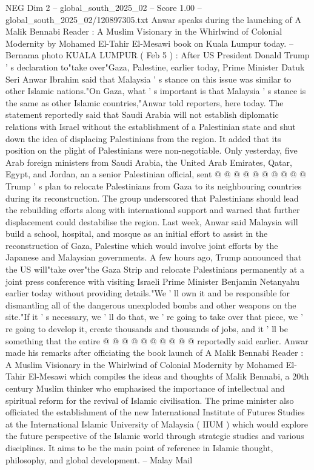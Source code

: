 \begin{textsample}{NEG Dim 2 – global\_south\_2025\_02 – Score 1.00 – global\_south\_2025\_02/120897305.txt}  \label{ex:f2_neg_025}
Anwar speaks during the launching of A Malik Bennabi Reader : A Muslim Visionary in the Whirlwind of Colonial Modernity by Mohamed El-Tahir El-Mesawi book on Kuala Lumpur today. -- Bernama photo KUALA LUMPUR ( Feb 5 ) : After US President Donald Trump ' s declaration to"take over"Gaza, Palestine, earlier today, Prime Minister Datuk Seri Anwar Ibrahim said that Malaysia ' s stance on this issue was similar to other Islamic nations."On Gaza, what ' s important is that Malaysia ' s stance is the same as other Islamic countries,"Anwar told reporters, here today.
The statement reportedly said that Saudi Arabia will not establish diplomatic relations with Israel without the establishment of a Palestinian state and shut down the idea of displacing Palestinians from the region.
It added that its position on the plight of Palestinians were non-negotiable.
Only yesterday, five Arab foreign ministers from Saudi Arabia, the United Arab Emirates, Qatar, Egypt, and Jordan, an a senior Palestinian official, sent @ @ @ @ @ @ @ @ @ @ Trump ' s plan to relocate Palestinians from Gaza to its neighbouring countries during its reconstruction.
The group underscored that Palestinians should lead the rebuilding efforts along with international support and warned that further displacement could destabilise the region.
Last week, Anwar said Malaysia will build a school, hospital, and mosque as an initial effort to assist in the reconstruction of Gaza, Palestine which would involve joint efforts by the Japanese and Malaysian governments.
A few hours ago, Trump announced that the US will"take over"the Gaza Strip and relocate Palestinians permanently at a joint press conference with visiting Israeli Prime Minister Benjamin Netanyahu earlier today without providing details."We ' ll own it and be responsible for dismantling all of the dangerous unexploded bombs and other weapons on the site."If it ' s necessary, we ' ll do that, we ' re going to take over that piece, we ' re going to develop it, create thousands and thousands of jobs, and it ' ll be something that the entire @ @ @ @ @ @ @ @ @ @ reportedly said earlier.
Anwar made his remarks after officiating the book launch of A Malik Bennabi Reader : A Muslim Visionary in the Whirlwind of Colonial Modernity by Mohamed El-Tahir El-Mesawi which compiles the ideas and thoughts of Malik Bennabi, a 20th century Muslim thinker who emphasised the importance of intellectual and spiritual reform for the revival of Islamic civilisation.
The prime minister also officiated the establishment of the new International Institute of Futures Studies at the International Islamic University of Malaysia ( IIUM ) which would explore the future perspective of the Islamic world through strategic studies and various disciplines.
It aims to be the main point of reference in Islamic thought, philosophy, and global development. -- Malay Mail

\end{textsample}
